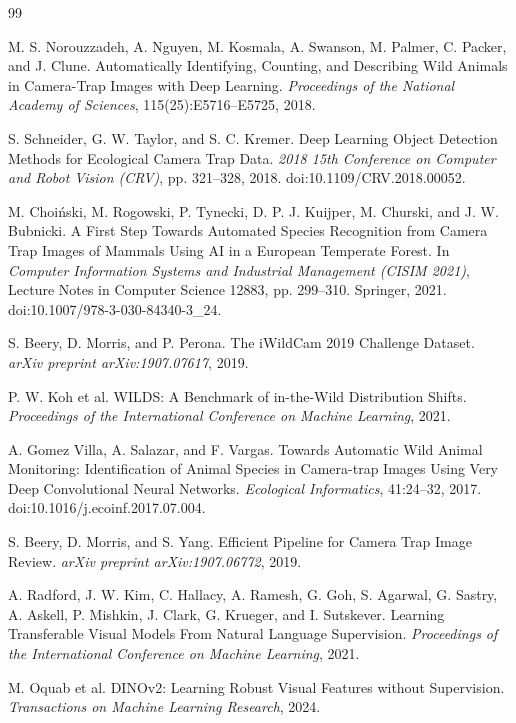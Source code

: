 \documentclass{article}
\begin{document}
\clearpage
\begingroup
\footnotesize
\begin{thebibliography}{99}

M. S. Norouzzadeh, A. Nguyen, M. Kosmala, A. Swanson, M. Palmer, C. Packer, and J. Clune.
Automatically Identifying, Counting, and Describing Wild Animals in Camera-Trap Images with Deep Learning.
\emph{Proceedings of the National Academy of Sciences}, 115(25):E5716--E5725, 2018.

S. Schneider, G. W. Taylor, and S. C. Kremer.
Deep Learning Object Detection Methods for Ecological Camera Trap Data.
\emph{2018 15th Conference on Computer and Robot Vision (CRV)}, pp. 321--328, 2018.
doi:10.1109/CRV.2018.00052.

M. Choi{\'n}ski, M. Rogowski, P. Tynecki, D. P. J. Kuijper, M. Churski, and J. W. Bubnicki.
A First Step Towards Automated Species Recognition from Camera Trap Images of Mammals Using AI in a European Temperate Forest.
In \emph{Computer Information Systems and Industrial Management (CISIM 2021)}, Lecture Notes in Computer Science 12883, pp. 299--310. Springer, 2021.
doi:10.1007/978-3-030-84340-3\_24.

S. Beery, D. Morris, and P. Perona.
The iWildCam 2019 Challenge Dataset.
\emph{arXiv preprint arXiv:1907.07617}, 2019.

P. W. Koh et al.
WILDS: A Benchmark of in-the-Wild Distribution Shifts.
\emph{Proceedings of the International Conference on Machine Learning}, 2021.

A. Gomez Villa, A. Salazar, and F. Vargas.
Towards Automatic Wild Animal Monitoring: Identification of Animal Species in Camera-trap Images Using Very Deep Convolutional Neural Networks.
\emph{Ecological Informatics}, 41:24--32, 2017.
doi:10.1016/j.ecoinf.2017.07.004.

S. Beery, D. Morris, and S. Yang.
Efficient Pipeline for Camera Trap Image Review.
\emph{arXiv preprint arXiv:1907.06772}, 2019.

A. Radford, J. W. Kim, C. Hallacy, A. Ramesh, G. Goh, S. Agarwal, G. Sastry, A. Askell, P. Mishkin, J. Clark, G. Krueger, and I. Sutskever.
Learning Transferable Visual Models From Natural Language Supervision.
\emph{Proceedings of the International Conference on Machine Learning}, 2021.

M. Oquab et al.
DINOv2: Learning Robust Visual Features without Supervision.
\emph{Transactions on Machine Learning Research}, 2024.


\end{thebibliography}
\end{document}
